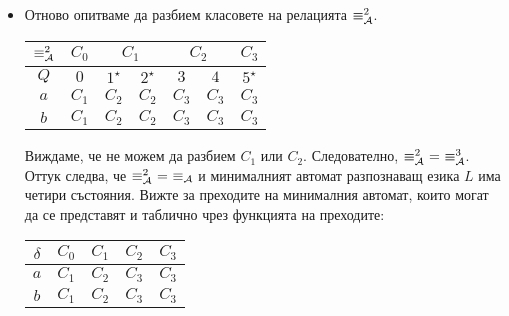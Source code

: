\begin{extra2}
\begin{example}
\begin{itemize}
    Имаме, че $0 \equiv^1_\A 3$, но $0 \not\equiv^2_\A 3$. Следователно $\equiv^1_\A\ \neq\ \equiv^2_\A$.
    Класовете на еквивалентност на $\equiv^2_\A$ са следните:
    \begin{align*}
      & C_0 \df \{0\},\\
      & C_1 \df \{1,2\},\\
      & C_2 \df \{3,4\},\\
      & C_3 \df \{5\}.
    \end{align*}
  \item
    Отново опитваме да разбием класовете на релацията $\equiv^2_\A$.

      \begin{tabular}{|c|c|c|c|c|c|c|}
        \hline
        $\equiv^2_\A$ & $C_0$ & \multicolumn{2}{|c|}{$C_1$} & \multicolumn{2}{|c|}{$C_2$} & $C_3$\\
        \hline
        \hline
        $Q$ & $0$ & $1^\star$ & $2^\star$ & $3$ & $4$ & $5^\star$ \\
        \hline
        $a$ & $C_1$& $C_2$ & $C_2$ & $C_3$ & $C_3$ & $C_3$\\
        \hline
        $b$ & $C_1$& $C_2$ & $C_2$ & $C_3$ & $C_3$ & $C_3$\\
        \hline
      \end{tabular}
      
      
      Виждаме, че не можем да разбием $C_1$ или $C_2$.
      Следователно, $\equiv^2_\A\ =\ \equiv^3_\A$.
      Оттук следва, че $\equiv^2_{\mathcal{A}}\ =\ \equiv_{\mathcal{A}}$ и минималният автомат разпознаващ езика $L$
      има четири състояния. Вижте  за преходите на минималния автомат,
      които могат да се представят и таблично чрез функцията на преходите:

      \begin{tabular}{|c|c|c|c|c|}
        \hline
        $\delta$ & $C_0$ & $C_1$ & $C_2$ & $C_3$ \\
        \hline
        $a$ & $C_1$ & $C_2$ & $C_3$ & $C_3$ \\
        \hline
        $b$ & $C_1$ & $C_2$ & $C_3$ & $C_3$ \\
        \hline
      \end{tabular}
    \end{itemize}

    \begin{figure}[H]
      \centering
\end{figure}
\end{example}
\end{extra2}
